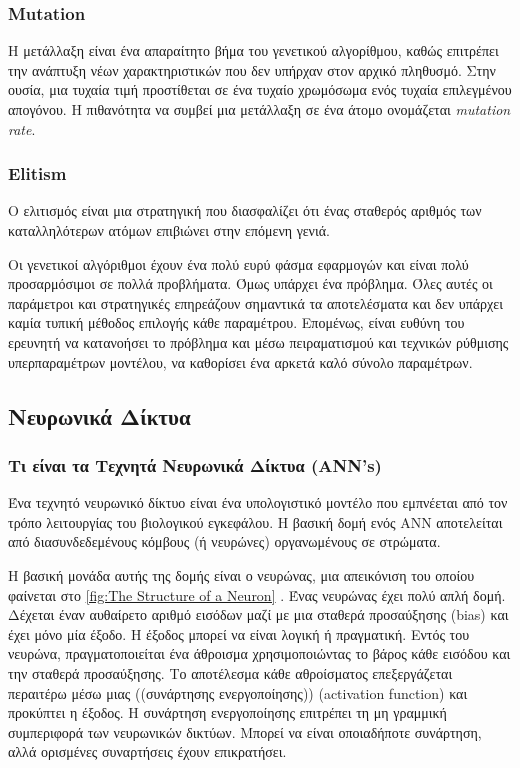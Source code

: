 \subsubsection{\textlatin{Mutation}}

Η μετάλλαξη είναι ένα απαραίτητο βήμα του γενετικού αλγορίθμου, καθώς επιτρέπει την ανάπτυξη νέων χαρακτηριστικών που δεν υπήρχαν στον αρχικό πληθυσμό. Στην ουσία, μια τυχαία τιμή προστίθεται σε ένα τυχαίο χρωμόσωμα ενός τυχαία επιλεγμένου απογόνου. Η πιθανότητα να συμβεί μια μετάλλαξη σε ένα άτομο ονομάζεται \textlatin{\emph{mutation rate}}.

\subsubsection{\textlatin{Elitism}}

Ο ελιτισμός είναι μια στρατηγική που διασφαλίζει ότι ένας σταθερός αριθμός των καταλληλότερων
ατόμων επιβιώνει στην επόμενη γενιά.

Οι γενετικοί αλγόριθμοι έχουν ένα πολύ ευρύ φάσμα εφαρμογών και είναι πολύ προσαρμόσιμοι σε πολλά προβλήματα. Όμως υπάρχει ένα πρόβλημα. Όλες αυτές οι παράμετροι και στρατηγικές επηρεάζουν σημαντικά τα αποτελέσματα και δεν υπάρχει καμία τυπική μέθοδος επιλογής κάθε παραμέτρου. Επομένως, είναι ευθύνη του ερευνητή να κατανοήσει το πρόβλημα και μέσω πειραματισμού και τεχνικών ρύθμισης υπερπαραμέτρων μοντέλου, να καθορίσει ένα
αρκετά καλό σύνολο παραμέτρων.

\subsection{Νευρωνικά Δίκτυα}
\label{neural-networks}

\subsubsection{Τι είναι τα Τεχνητά Νευρωνικά Δίκτυα \textlatin{(ANN's)}}

Ένα τεχνητό νευρωνικό δίκτυο είναι ένα υπολογιστικό μοντέλο που εμπνέεται από τον τρόπο λειτουργίας του βιολογικού εγκεφάλου. Η βασική δομή ενός \textlatin{ANN} αποτελείται από διασυνδεδεμένους κόμβους (ή νευρώνες) οργανωμένους σε στρώματα.

Η βασική μονάδα αυτής της δομής είναι ο νευρώνας, μια απεικόνιση του οποίου φαίνεται	στο \autoref{fig:The Structure of a Neuron} . Ένας νευρώνας έχει πολύ απλή δομή. Δέχεται έναν αυθαίρετο αριθμό εισόδων μαζί με μια σταθερά προσαύξησης (\textlatin{bias}) και έχει μόνο μία έξοδο. Η έξοδος μπορεί να είναι λογική ή πραγματική. Εντός του νευρώνα, πραγματοποιείται ένα άθροισμα χρησιμοποιώντας το βάρος κάθε εισόδου και την σταθερά προσαύξησης. Το αποτέλεσμα κάθε αθροίσματος επεξεργάζεται περαιτέρω μέσω μιας ((συνάρτησης ενεργοποίησης)) (\textlatin{activation function}) και προκύπτει η έξοδος. Η συνάρτηση ενεργοποίησης επιτρέπει τη μη γραμμική συμπεριφορά των νευρωνικών δικτύων. Μπορεί να είναι οποιαδήποτε συνάρτηση, αλλά ορισμένες συναρτήσεις έχουν επικρατήσει.

